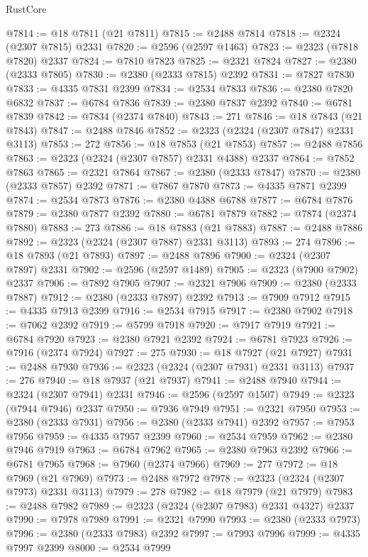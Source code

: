 \begin{lexlean}{RustCore}
\begin{coremodule}
@7814 := @18 @7811 (@21 @7811)
@7815 := @2488 @7814
@7818 := @2324 (@2307 @7815) @2331
@7820 := @2596 (@2597 @1463)
@7823 := @2323 (@7818 @7820) @2337
@7824 := @7810 @7823
@7825 := @2321 @7824
@7827 := @2380 (@2333 @7805)
@7830 := @2380 (@2333 @7815) @2392
@7831 := @7827 @7830
@7833 := @4335 @7831 @2399
@7834 := @2534 @7833
@7836 := @2380 @7820 @6832
@7837 := @6784 @7836
@7839 := @2380 @7837 @2392
@7840 := @6781 @7839
@7842 := @7834 (@2374 @7840)
@7843 := 271
@7846 := @18 @7843 (@21 @7843)
@7847 := @2488 @7846
@7852 := @2323 (@2324 (@2307 @7847) @2331 @3113)
@7853 := 272
@7856 := @18 @7853 (@21 @7853)
@7857 := @2488 @7856
@7863 := @2323 (@2324 (@2307 @7857) @2331 @4388) @2337
@7864 := @7852 @7863
@7865 := @2321 @7864
@7867 := @2380 (@2333 @7847)
@7870 := @2380 (@2333 @7857) @2392
@7871 := @7867 @7870
@7873 := @4335 @7871 @2399
@7874 := @2534 @7873
@7876 := @2380 @4388 @6788
@7877 := @6784 @7876
@7879 := @2380 @7877 @2392
@7880 := @6781 @7879
@7882 := @7874 (@2374 @7880)
@7883 := 273
@7886 := @18 @7883 (@21 @7883)
@7887 := @2488 @7886
@7892 := @2323 (@2324 (@2307 @7887) @2331 @3113)
@7893 := 274
@7896 := @18 @7893 (@21 @7893)
@7897 := @2488 @7896
@7900 := @2324 (@2307 @7897) @2331
@7902 := @2596 (@2597 @1489)
@7905 := @2323 (@7900 @7902) @2337
@7906 := @7892 @7905
@7907 := @2321 @7906
@7909 := @2380 (@2333 @7887)
@7912 := @2380 (@2333 @7897) @2392
@7913 := @7909 @7912
@7915 := @4335 @7913 @2399
@7916 := @2534 @7915
@7917 := @2380 @7902
@7918 := @7062 @2392
@7919 := @5799 @7918
@7920 := @7917 @7919
@7921 := @6784 @7920
@7923 := @2380 @7921 @2392
@7924 := @6781 @7923
@7926 := @7916 (@2374 @7924)
@7927 := 275
@7930 := @18 @7927 (@21 @7927)
@7931 := @2488 @7930
@7936 := @2323 (@2324 (@2307 @7931) @2331 @3113)
@7937 := 276
@7940 := @18 @7937 (@21 @7937)
@7941 := @2488 @7940
@7944 := @2324 (@2307 @7941) @2331
@7946 := @2596 (@2597 @1507)
@7949 := @2323 (@7944 @7946) @2337
@7950 := @7936 @7949
@7951 := @2321 @7950
@7953 := @2380 (@2333 @7931)
@7956 := @2380 (@2333 @7941) @2392
@7957 := @7953 @7956
@7959 := @4335 @7957 @2399
@7960 := @2534 @7959
@7962 := @2380 @7946 @7919
@7963 := @6784 @7962
@7965 := @2380 @7963 @2392
@7966 := @6781 @7965
@7968 := @7960 (@2374 @7966)
@7969 := 277
@7972 := @18 @7969 (@21 @7969)
@7973 := @2488 @7972
@7978 := @2323 (@2324 (@2307 @7973) @2331 @3113)
@7979 := 278
@7982 := @18 @7979 (@21 @7979)
@7983 := @2488 @7982
@7989 := @2323 (@2324 (@2307 @7983) @2331 @4327) @2337
@7990 := @7978 @7989
@7991 := @2321 @7990
@7993 := @2380 (@2333 @7973)
@7996 := @2380 (@2333 @7983) @2392
@7997 := @7993 @7996
@7999 := @4335 @7997 @2399
@8000 := @2534 @7999

\end{coremodule}
\end{lexlean}
